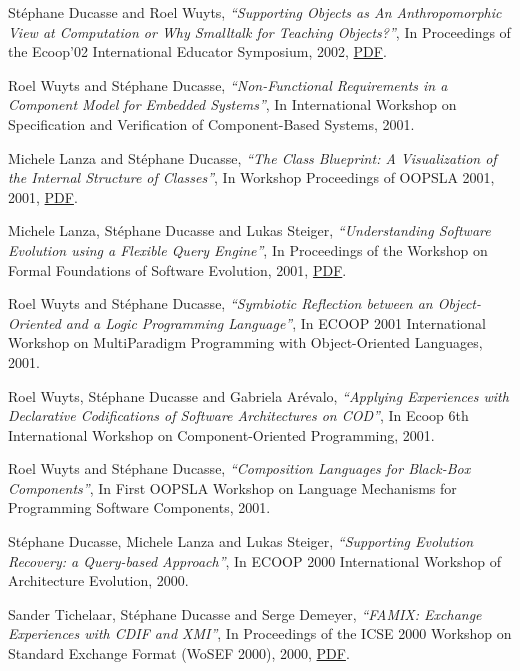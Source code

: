 \documentclass{article}
\newcommand{\czauthors}[1]{#1}
\newcommand{\cztitle}[1]{\emph{``#1''}}
\newcommand{\czbooktitle}[1]{#1}
\begin{document}
\begin{itemize}
	\pub  \czauthors{St\'ephane Ducasse and Roel Wuyts},  \cztitle{Supporting Objects as An Anthropomorphic View at Computation or Why {Smalltalk} for Teaching Objects?},  In \czbooktitle{Proceedings of the Ecoop'02 International Educator Symposium}, 2002, \href{http://rmod-files.lille.inria.fr/Team/Texts/Papers/Duca02aTeacherWorkshop.pdf}{PDF}.

	\pub  \czauthors{Roel Wuyts and St\'ephane Ducasse},  \cztitle{Non-Functional Requirements in a Component Model for Embedded Systems},  In \czbooktitle{International Workshop on Specification and Verification of Component-Based Systems}, 2001.

	\pub  \czauthors{Michele Lanza and St\'ephane Ducasse},  \cztitle{The Class Blueprint: A Visualization of the Internal Structure of Classes},  In \czbooktitle{Workshop Proceedings of OOPSLA 2001}, 2001, \href{http://rmod-files.lille.inria.fr/Team/Texts/Papers/Lanz01dClassBlueprint.pdf}{PDF}.

	\pub  \czauthors{Michele Lanza, St\'ephane Ducasse and Lukas Steiger},  \cztitle{Understanding Software Evolution using a Flexible Query Engine},  In \czbooktitle{Proceedings of the Workshop on Formal Foundations of Software Evolution}, 2001, \href{http://rmod-files.lille.inria.fr/Team/Texts/Papers/Lanz01aQueryEngine.pdf}{PDF}.

	\pub  \czauthors{Roel Wuyts and St\'ephane Ducasse},  \cztitle{Symbiotic Reflection between an Object-Oriented and a Logic Programming Language},  In \czbooktitle{ECOOP 2001 International Workshop on MultiParadigm Programming with Object-Oriented Languages}, 2001.

	\pub  \czauthors{Roel Wuyts, St\'ephane Ducasse and Gabriela Ar{\'e}valo},  \cztitle{Applying Experiences with Declarative Codifications of Software Architectures on COD},  In \czbooktitle{Ecoop 6th International Workshop on Component-Oriented Programming}, 2001.

	\pub  \czauthors{Roel Wuyts and St\'ephane Ducasse},  \cztitle{Composition Languages for Black-Box Components},  In \czbooktitle{First OOPSLA Workshop on Language Mechanisms for Programming Software Components}, 2001.

	\pub  \czauthors{St\'ephane Ducasse, Michele Lanza and Lukas Steiger},  \cztitle{Supporting Evolution Recovery: a Query-based Approach},  In \czbooktitle{ECOOP 2000 International Workshop of Architecture Evolution}, 2000.

	\pub  \czauthors{Sander Tichelaar, St\'ephane Ducasse and Serge Demeyer},  \cztitle{{FAMIX}: Exchange Experiences with {CDIF} and {XMI}},  In \czbooktitle{Proceedings of the ICSE 2000 Workshop on Standard Exchange Format (WoSEF 2000)}, 2000, \href{http://rmod-files.lille.inria.fr/Team/Texts/Papers/Tich00mFamixCdifXmi.pdf}{PDF}.


\end{itemize}
\end{document}
